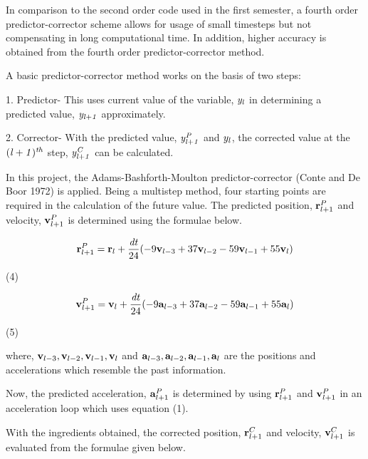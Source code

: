 \documentclass[11pt]{article}
\begin{document}
{\normalsize{
In comparison to the second order code used in the first semester, a fourth order predictor-corrector scheme allows for usage of small timesteps but not compensating in long computational time. In addition, higher accuracy is obtained from the fourth order predictor-corrector method.
\smallskip 

A basic predictor-corrector method works on the basis of two steps:

\medskip

1. Predictor- This uses current value of the variable, ${\it y_l}$ in determining a predicted value, ${\it y_{l+1}}$ approximately.

\smallskip

2. Corrector- With the predicted value, ${\it y_{l+1}^P}$ and ${\it y_l}$, the corrected value at the ${\it (l+1)^{th}}$ step, ${\it y_{l+1}^C}$ can be calculated.

\medskip

In this project, the Adams-Bashforth-Moulton predictor-corrector (Conte and De Boor 1972) is applied. Being a multistep method, four starting points are required in the calculation of the future value. The predicted position, ${{\bf r}_{l+1}^P}$ and velocity, ${{\bf v}_{l+1}^P}$ is determined using the formulae below.
\medskip

\[ {\bf r}_{l+1}^P = {\bf r}_l + \frac{{\it dt}} {24} (-9{\bf v}_{l-3} + 37{\bf v}_{l-2} - 59{\bf v}_{l-1} + 55{\bf v}_l) \]
\begin{flushright} (4) \end{flushright}

\[ {\bf v}_{l+1}^P = {\bf v}_l + \frac{{\it dt}} {24} (-9{\bf a}_{l-3} + 37{\bf a}_{l-2} - 59{\bf a}_{l-1} + 55{\bf a}_l) \]
\begin{flushright} (5) \end{flushright}

\smallskip

where,
\smallskip
${\bf v}_{l-3}, {\bf v}_{l-2}, {\bf v}_{l-1}, {\bf v}_l$ and ${\bf a}_{l-3}, {\bf a}_{l-2}, {\bf a}_{l-1}, {\bf a}_l$ are the positions and accelerations which resemble the past information.

\medskip

Now, the predicted acceleration, ${\bf a}_{l+1}^P$ is determined by using ${\bf r}_{l+1}^P$ and ${\bf v}_{l+1}^P$ in an acceleration loop which uses equation (1). 
\medskip

With the ingredients obtained, the corrected position, ${\bf r}_{l+1}^C$ and velocity, ${\bf v}_{l+1}^C$ is evaluated from the formulae given below.

}}
\end{document}
